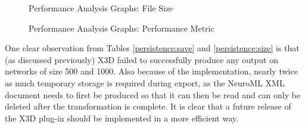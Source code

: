 \documentclass{acm_proc_article-sp}
\begin{document}
{\begin{figure}[t]
\centering
{}
\caption{Performance Analysis Graphs: File Size}
\label{appendix:persistence:perf:size}
\end{figure}

\begin{figure}[t]
\centering
{}
\caption{Performance Analysis Graphs: Performance Metric}
\label{appendix:persistence:perf:metric}
\end{figure}

One clear observation from Tables \ref{persistence:save} and \ref{persistence:size} is that (as discussed previously) X3D failed to successfully produce any output on networks of size 500 and 1000. Also because of the implementation, nearly twice as much temporary storage is required during export, as the NeuroML XML document needs to first be produced so that it can then be read and can only be deleted after the transformation is complete. It is clear that a future release of the X3D plug{}-in should be implemented in a more efficient way.

}
\end{document}
